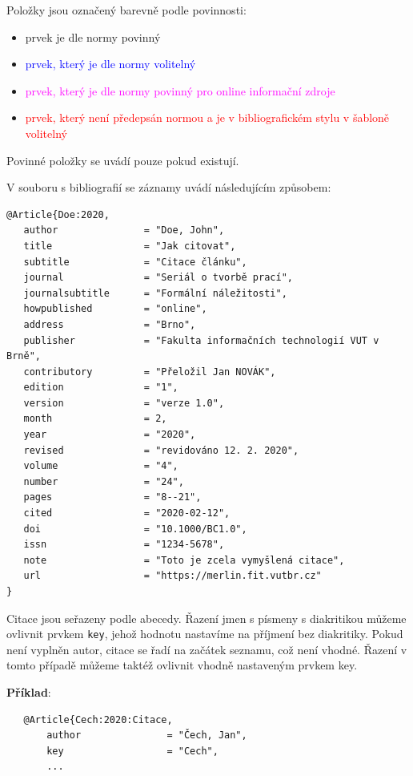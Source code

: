 \noindent Položky jsou označený barevně podle povinnosti:
\begin{itemize}
    \item prvek je dle normy povinný
    \item \textcolor{blue}{prvek, který je dle normy volitelný}
    \item \textcolor{magenta}{prvek, který je dle normy povinný pro online informační zdroje}
    \item \textcolor{red}{prvek, který není předepsán normou a je v bibliografickém stylu v šabloně volitelný}
\end{itemize}
Povinné položky se uvádí pouze pokud existují.

\newpage
\noindent V souboru s bibliografií se záznamy uvádí následujícím způsobem:
\begin{verbatim}
@Article{Doe:2020,
   author               = "Doe, John",
   title                = "Jak citovat",
   subtitle             = "Citace článku",
   journal              = "Seriál o tvorbě prací",
   journalsubtitle      = "Formální náležitosti",
   howpublished         = "online",
   address              = "Brno",
   publisher            = "Fakulta informačních technologií VUT v Brně",
   contributory         = "Přeložil Jan NOVÁK",
   edition              = "1",
   version              = "verze 1.0",
   month                = 2,
   year                 = "2020",
   revised              = "revidováno 12. 2. 2020",
   volume               = "4",
   number               = "24",
   pages                = "8--21",
   cited                = "2020-02-12",
   doi                  = "10.1000/BC1.0",
   issn                 = "1234-5678",
   note                 = "Toto je zcela vymyšlená citace",
   url                  = "https://merlin.fit.vutbr.cz"
}
\end{verbatim}

Citace jsou seřazeny podle abecedy. Řazení jmen s písmeny s diakritikou můžeme ovlivnit prvkem \texttt{key}, jehož  hodnotu nastavíme na příjmení bez diakritiky. Pokud není vyplněn autor, citace se řadí na začátek seznamu, což není vhodné. Řazení v tomto případě můžeme taktéž ovlivnit vhodně nastaveným prvkem key.

\medskip
\medskip
\noindent \textbf{Příklad}:
\begin{verbatim}
   @Article{Cech:2020:Citace,
	   author               = "Čech, Jan",
	   key                  = "Cech",
	   ... 
\end{verbatim}


\newpage
